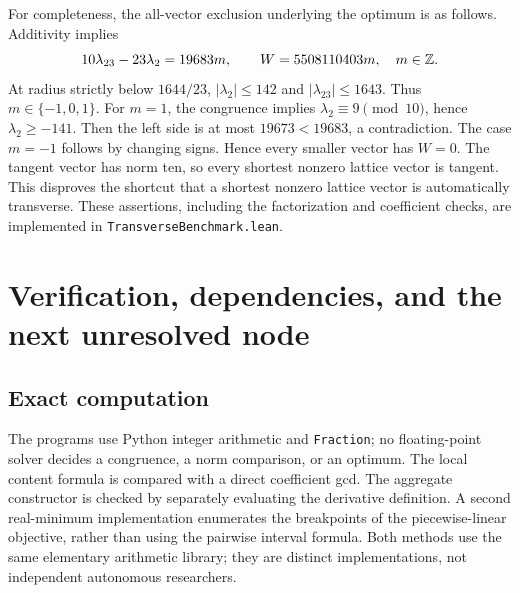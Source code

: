 For completeness, the all-vector exclusion underlying the optimum is as follows. Additivity implies
\[
 10\lambda_{23}-23\lambda_2=19683m,
 \qquad W=5508110403m,\quad m\in\mathbb Z.
\]
At radius strictly below $1644/23$, $|\lambda_2|\le142$ and $|\lambda_{23}|\le1643$. Thus $m\in\{-1,0,1\}$. For $m=1$, the congruence implies $\lambda_2\equiv9\pmod{10}$, hence $\lambda_2\ge-141$. Then the left side is at most $19673<19683$, a contradiction. The case $m=-1$ follows by changing signs. Hence every smaller vector has $W=0$. The tangent vector has norm ten, so every shortest nonzero lattice vector is tangent. This disproves the shortcut that a shortest nonzero lattice vector is automatically transverse. These assertions, including the factorization and coefficient checks, are implemented in \texttt{TransverseBenchmark.lean}.

\section{Verification, dependencies, and the next unresolved node}\label{transverse:sec:audit}
\subsection{Exact computation}
The programs use Python integer arithmetic and \texttt{Fraction}; no floating-point solver decides a congruence, a norm comparison, or an optimum. The local content formula is compared with a direct coefficient gcd. The aggregate constructor is checked by separately evaluating the derivative definition. A second real-minimum implementation enumerates the breakpoints of the piecewise-linear objective, rather than using the pairwise interval formula. Both methods use the same elementary arithmetic library; they are distinct implementations, not independent autonomous researchers.

